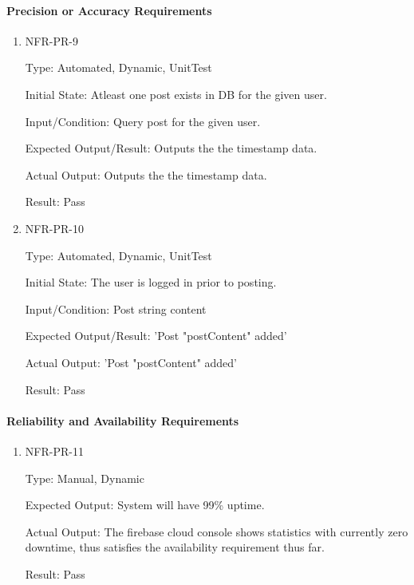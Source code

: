 \documentclass[12pt, titlepage]{article}
\begin{document}
\paragraph{Precision or Accuracy Requirements}
\begin{enumerate}
    \item{NFR-PR-9\\}
    
    Type: Automated, Dynamic, UnitTest
    
    Initial State: Atleast one post exists in DB for the given user.
    					
    Input/Condition: Query post for the given user.
    					
    Expected Output/Result: Outputs the the timestamp data.
    					
    Actual Output: Outputs the the timestamp data.
    					
    Result: Pass
    
\item{NFR-PR-10\\}
    
    Type: Automated, Dynamic, UnitTest
    
    Initial State: The user is logged in prior to posting.
    					
    Input/Condition: Post string content
    					
    Expected Output/Result: 'Post "{postContent}" added'
    					
    Actual Output: 'Post "{postContent}" added'
    					
    Result: Pass

\end{enumerate}

\paragraph{Reliability and Availability Requirements}
\begin{enumerate}
    \item{NFR-PR-11\\}
    
    Type: Manual, Dynamic
    
    Expected Output: System will have 99\% uptime.
    
    Actual Output: The firebase cloud console shows statistics with currently zero downtime, thus satisfies the availability requirement thus far.
    					
    Result: Pass
 \end{enumerate}   
 
\end{document}
